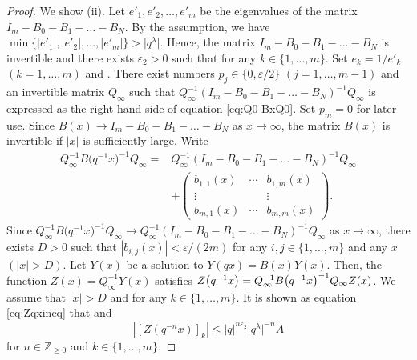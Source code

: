 \documentclass[pdftex]{sigma}
\numberwithin{equation}{section}
\theoremstyle{definition}
\begin{document}
\begin{proof}
We show (ii).
Let $e'_1, e'_2, \dots ,e'_m$ be the eigenvalues of the matrix $I_m- B_0 -B_1 - \dots - B_N$.
By the assumption, we have $\min \{ |e'_1|, |e'_2|, \dots , |e'_m| \} > \big|q^{\lambda }\big|$.
Hence, the matrix $I_m -B_0 -B_1 - \dots - B_N$ is invertible and there exists $\varepsilon _2 >0$ such that  for any $k \in \{1, \dots ,m \}$.
Set $e_k =1/e'_k $ $(k=1,\dots ,m )$ and .
There exist numbers $p_j \in \{ 0, \varepsilon /2 \}$ $(j=1, \dots , m-1)$ and an invertible matrix $Q_{\infty }$ such that $Q_{\infty }^{-1} ( I_m -B_0 -B_1 - \dots - B_N ) ^{-1} Q_{\infty }$ is expressed as the right-hand side of equation \eqref{eq:Q0-BxQ0}.
Set $p_m=0$ for later use.
Since $B(x) \to I_m -B_0 -B_1 - \dots - B_N $ as $x \to \infty $, the matrix $B(x)$ is invertible if $|x|$ is sufficiently large.
Write
\begin{align*}
 Q_{\infty }^{-1} B\bigl(q^{-1} x\bigr)^{-1} Q_{\infty } = {}& Q_{\infty }^{-1} ( I_m -B_0 -B_1 - \dots - B_N ) ^{-1} Q_{\infty } \\
& + \begin{pmatrix}
b_{1,1} (x) & \cdots & b_{1,m} (x) \\
\vdots & & \vdots \\
 b_{m,1} (x) & \cdots & b_{m,m} (x)
\end{pmatrix}.
\end{align*}
Since $Q_{\infty }^{-1} B\bigl(q^{-1} x\bigr)^{-1} Q_{\infty } \to Q_{\infty }^{-1} ( I_m -B_0 -B_1 - \dots - B_N ) ^{-1} Q_{\infty } $ as $x \to \infty $, there exists $D >0$ such that $|b_{i,j}(x)| < \varepsilon /(2m)$ for any $i,j \in \{1, \dots ,m \}$ and any $x$ $(|x| > D )$.
Let $Y (x)$ be a solution to $Y (qx) = B(x)Y (x)$.
Then, the function $Z(x) = Q_{\infty }^{-1} Y (x)$ satisfies $Z\bigl(q^{-1}x\bigr) = \smash{Q_{\infty }^{-1} B\bigl(q^{-1}x\bigr) ^{-1} Q_{\infty } Z(x)}$.
We assume that $|x| > D $ and  for any $k \in \{1, \dots ,m \}$.
It is shown as equation \eqref{eq:Zqxineq} that  and
\begin{equation}
 | [Z(q^{-n} x )]_k | \leq |q | ^{n \varepsilon _2} \big|q ^{\lambda }\big|^{-n} \widetilde{A} \label{eq:ineq2}
\end{equation}
for $n \in \mathbb{Z} _{\geq 0} $ and $k \in \{1, \dots ,m \}$.


\end{proof}
\end{document}
